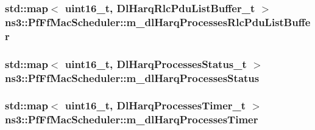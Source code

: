 \subsubsection[{\texorpdfstring{m\+\_\+dl\+Harq\+Processes\+Rlc\+Pdu\+List\+Buffer}{m_dlHarqProcessesRlcPduListBuffer}}]{\setlength{\rightskip}{0pt plus 5cm}std\+::map$<$ uint16\+\_\+t, {\bf Dl\+Harq\+Rlc\+Pdu\+List\+Buffer\+\_\+t} $>$ ns3\+::\+Pf\+Ff\+Mac\+Scheduler\+::m\+\_\+dl\+Harq\+Processes\+Rlc\+Pdu\+List\+Buffer\hspace{0.3cm}{\ttfamily [private]}}\hypertarget{classns3_1_1PfFfMacScheduler_acf9952b5bb3d26644b5e25054ca6e385}{}\label{classns3_1_1PfFfMacScheduler_acf9952b5bb3d26644b5e25054ca6e385}
\subsubsection[{\texorpdfstring{m\+\_\+dl\+Harq\+Processes\+Status}{m_dlHarqProcessesStatus}}]{\setlength{\rightskip}{0pt plus 5cm}std\+::map$<$ uint16\+\_\+t, {\bf Dl\+Harq\+Processes\+Status\+\_\+t} $>$ ns3\+::\+Pf\+Ff\+Mac\+Scheduler\+::m\+\_\+dl\+Harq\+Processes\+Status\hspace{0.3cm}{\ttfamily [private]}}\hypertarget{classns3_1_1PfFfMacScheduler_a438c2319e01eaac65f64cbd82b3e8089}{}\label{classns3_1_1PfFfMacScheduler_a438c2319e01eaac65f64cbd82b3e8089}
\subsubsection[{\texorpdfstring{m\+\_\+dl\+Harq\+Processes\+Timer}{m_dlHarqProcessesTimer}}]{\setlength{\rightskip}{0pt plus 5cm}std\+::map$<$ uint16\+\_\+t, {\bf Dl\+Harq\+Processes\+Timer\+\_\+t} $>$ ns3\+::\+Pf\+Ff\+Mac\+Scheduler\+::m\+\_\+dl\+Harq\+Processes\+Timer\hspace{0.3cm}{\ttfamily [private]}}\hypertarget{classns3_1_1PfFfMacScheduler_ab115ef9abb936f35aeb5979a8ed8928d}{}\label{classns3_1_1PfFfMacScheduler_ab115ef9abb936f35aeb5979a8ed8928d}
